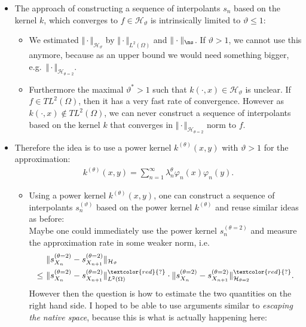 \documentclass[a4paper, 10pt]{article}
\newcommand{\Ht}{\mathcal{H}_{\vartheta}}
\begin{document}
\begin{itemize}
\item The approach of constructing a sequence of interpolants $s_n$ based on the kernel $k$, which converges to $f \in \Ht$ is intrinsically limited to $\vartheta \leq 1$:
\begin{itemize}
\item We estimated $\Vert \cdot \Vert_{\Ht}$ by $\Vert \cdot \Vert_{L^2(\Omega)}$ and $\Vert \cdot \Vert_{\ns}$.
If $\vartheta > 1$, we cannot use this anymore, because as an upper bound we would need something bigger, e.g.\ $\Vert \cdot \Vert_{\mathcal{H}_{\theta = 2}}$.
\item Furthermore the maximal $\vartheta^* > 1$ such that $k(\cdot, x) \in \Ht$ is unclear. 
If $f \in TL^2(\Omega)$, then it has a very fast rate of convergence. 
However as $k(\cdot, x) \notin TL^2(\Omega)$, we can never construct a sequence of interpolants based on the kernel $k$ that converges in $\Vert \cdot \Vert_{\mathcal{H}_{\theta = 2}}$ norm to $f$.
\end{itemize}
\item Therefore the idea is to use a power kernel $k^{(\theta)}(x, y)$ with $\vartheta > 1$ for the approximation:
\begin{align}
\label{eq:power_kernel}
k^{(\theta)}(x,y) = \sum_{n=1}^\infty \lambda_n^{\theta} \varphi_n(x) \varphi_n(y).
\end{align}
\begin{itemize}
\item Using a power kernel $k^{(\theta)}(x, y)$, one can construct a sequence of interpolants $s_n^{(\vartheta)}$ based on the power kernel $k^{(\theta)}$ and reuse similar ideas as before: \\
Maybe one could immediately use the power kernel $s_n^{(\theta=2)}$ and measure the approximation rate in some weaker norm, i.e.\
\begin{align}
\label{eq:idea_how_to_estimate}
&\Vert s_{X_n}^{(\theta = 2)} - s_{X_{n+1}}^{(\theta = 2)} \Vert_{\Ht} \notag \\
\leq~& \Vert s_{X_n}^{(\theta = 2)} - s_{X_{n+1}}^{(\theta = 2)} \Vert_{L^2(\Omega)}^{\textcolor{red}{?}} \cdot \Vert s_{X_n}^{(\theta = 2)} - s_{X_{n+1}}^{(\theta = 2)} \Vert_{\mathcal{H}_{\theta = 2}}^{\textcolor{red}{?}}.
\end{align}
However then the question is how to estimate the two quantities on the right hand side.
I hoped to be able to use arguments similar to \textit{escaping the native space}, because this is what is actually happening here: 

\end{itemize}
\end{itemize}
\end{document}
